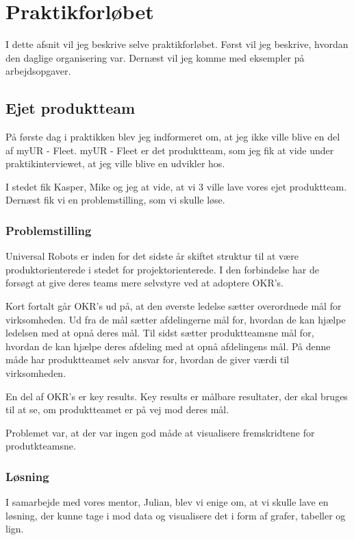 \documentclass[a4paper]{article}
\begin{document}
\section{Praktikforløbet}
I dette afsnit vil jeg beskrive selve praktikforløbet.
Først vil jeg beskrive, hvordan den daglige organisering var.
Dernæst vil jeg komme med eksempler på arbejdsopgaver.

\subsection{Ejet produktteam}
På første dag i praktikken blev jeg indformeret om,
at jeg ikke ville blive en del af myUR - Fleet.
myUR - Fleet er det produktteam, som jeg fik at vide under praktikinterviewet,
at jeg ville blive en udvikler hos.

I stedet fik Kasper, Mike og jeg at vide,
at vi 3 ville lave vores ejet produktteam.
Dernæst fik vi en problemstilling, som vi skulle løse.

\subsubsection{Problemstilling}
Universal Robots er inden for det sidste år skiftet struktur til at være 
produktorienterede i stedet for projektorienterede.
I den forbindelse har de forsøgt at give deres teams mere selvstyre ved at 
adoptere OKR's.

Kort fortalt går OKR's ud på, 
at den øverste ledelse sætter overordnede mål for virksomheden.
Ud fra de mål sætter afdelingerne mål for,
hvordan de kan hjælpe ledelsen med at opnå deres mål.
Til sidst sætter produktteamsne mål for, 
hvordan de kan hjælpe deres afdeling med at opnå afdelingens mål.
På denne måde har produktteamet selv ansvar for,
hvordan de giver værdi til virksomheden.

En del af OKR's er key results. 
Key results er målbare resultater, der skal bruges til at se,
om produktteamet er på vej mod deres mål.

Problemet var, at der var ingen god måde at visualisere 
fremskridtene for produtkteamsne.

\subsubsection{Løsning}
I samarbejde med vores mentor, Julian, blev vi enige om, at vi skulle lave en 
løsning, der kunne tage i mod data og visualisere det i form af 
grafer, tabeller og lign.
\end{document}
